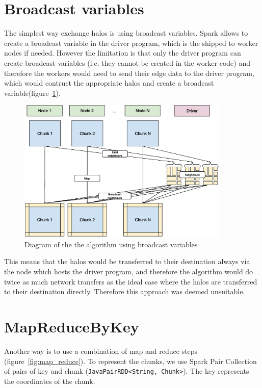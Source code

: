 \documentclass{l4proj}
\begin{document}
\section{Broadcast variables}

The simplest way exchange halos is using broadcast variables. Spark allows to
create a broadcast variable in the driver program, which is the shipped to worker
nodes if needed. However the limitation is that only the driver program can create
broadcast variables (i.e. they cannot be created in the worker code) and therefore
the workers would need to send their edge data to the driver program, which would
contruct the appropriate halos and create a broadcast variable(figure~\ref{fig:broadcast}).

\begin{figure}
\centering
\includegraphics[width=0.9\textwidth]{images/Broadcast_variable.eps}
\caption{Diagram of the the algorithm using broadcast variables}
\label{fig:broadcast}
\end{figure}

This means that the halos would be transferred to their destination always via
the node which hosts the driver program, and therefore the algorithm would do 
twice as much network transfers as the ideal case where the halos are transferred
to their destination directly. Therefore this approach was deemed unsuitable. 

\section{MapReduceByKey}

Another way is to use a combination of map and reduce steps (figure~\ref{fig:map_reduce}). To represent the 
chunks, we use Spark Pair Collection of pairs of key and chunk (\texttt{JavaPairRDD<String, Chunk>}). The key represents
the coordinates of the chunk.
\end{document}
